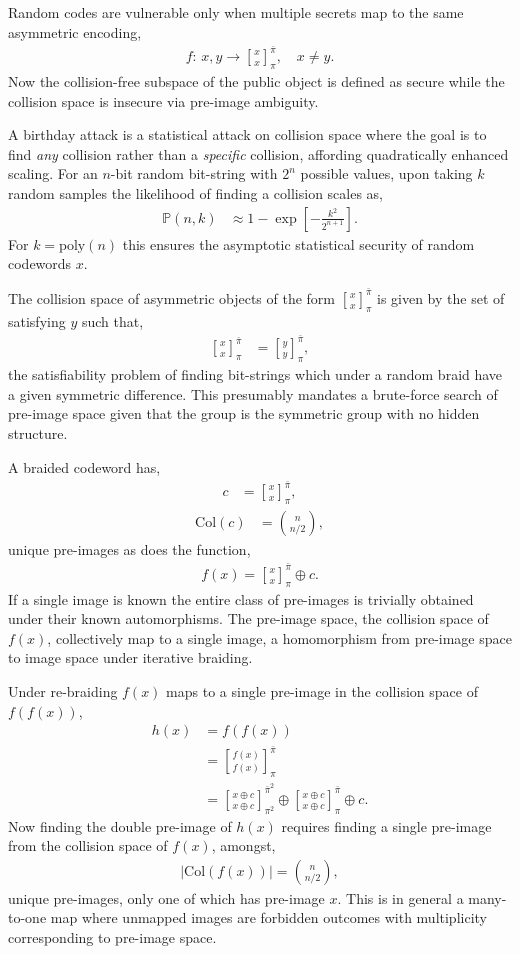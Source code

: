 \documentclass[twocolumn, aps, amsmath, amssymb, nofootinbib, superscriptaddress, longbibliography, doublefloatfix, table-of-contents, eqsecnum, rmp]{revtex4-2}
\newcommand{\stackbraid}[2]{{\genfrac{[}{]}{0pt}{}{{#1}}{{#2}}}^{\bar{\pi}}_{\pi}}
\newcommand{\stackbraidgen}[4]{{\genfrac{[}{]}{0pt}{}{{#1}}{{#2}}}^{#3}_{#4}}
\begin{document}
Random codes are vulnerable only when multiple secrets map to the same asymmetric encoding,
\begin{align}
	f:\, x,y \to \stackbraid{x}{x},\quad x\neq y.
\end{align}
Now the collision-free subspace of the public object is defined as secure while the collision space is insecure via pre-image ambiguity.

A birthday attack is a statistical attack on collision space where the goal is to find \emph{any} collision rather than a \emph{specific} collision, affording quadratically enhanced scaling. For an $n$-bit random bit-string with $2^n$ possible values, upon taking $k$ random samples the likelihood of finding a collision scales as,
\begin{align}
	\mathbb{P}(n,k) &\approx 1 - \exp\left[-\frac{k^2}{2^{n+1}}\right].
\end{align}
For $k=\mathrm{poly}(n)$ this ensures the asymptotic statistical security of random codewords $x$.

The collision space of asymmetric objects of the form $\stackbraid{x}{x}$ is given by the set of satisfying $y$ such that,
\begin{align}
	\stackbraid{x}{x} &= \stackbraid{y}{y},
\end{align}
the satisfiability problem of finding bit-strings which under a random braid have a given symmetric difference. This presumably mandates a brute-force search of pre-image space given that the group is the symmetric group with no hidden structure.

A braided codeword has,
\begin{align}
	c &= \stackbraid{x}{x},
\end{align}
\begin{align}
	\mathrm{Col}(c) &= \binom{n}{n/2},
\end{align}
unique pre-images as does the function,
\begin{align}
	f(x) = \stackbraid{x}{x}\oplus c.
\end{align}
If a single image is known the entire class of pre-images is trivially obtained under their known automorphisms. The pre-image space, the collision space of $f(x)$, collectively map to a single image, a homomorphism from pre-image space to image space under iterative braiding.

Under re-braiding $f(x)$ maps to a single pre-image in the collision space of $f(f(x))$,
\begin{align}
	h(x) &= f(f(x)) \nonumber\\
	&=\stackbraid{f(x)}{f(x)}\nonumber\\
	&= \stackbraidgen{x\oplus c}{x\oplus c}{\bar{\pi}^2}{\pi^2} \oplus \stackbraid{x\oplus c}{x\oplus c} \oplus c.
\end{align}
Now finding the double pre-image of $h(x)$ requires finding a single pre-image from the collision space of $f(x)$, amongst,
\begin{align}
	|\mathrm{Col}(f(x))| = \binom{n}{n/2},
\end{align}
unique pre-images, only one of which has pre-image $x$. This is in general a many-to-one map where unmapped images are forbidden outcomes with multiplicity corresponding to pre-image space.
\end{document}
